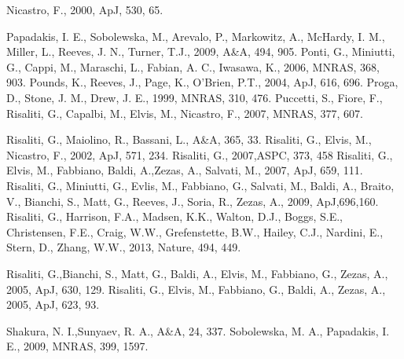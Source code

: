 \documentclass[useAMS,usenatbib]{sam}
\begin{document}
\begin{thebibliography}{99}
    
     Nicastro, F., 2000, ApJ, 530, 65.
    
     Papadakis, I. E., Sobolewska,  M., Arevalo,  P., Markowitz, A., McHardy, I. M., Miller,  L.,
    Reeves, J. N., 
    Turner, T.J., 2009, A\&A, 494, 905.
     Ponti, G., Miniutti, G., Cappi, M., Maraschi, L., Fabian, A. C., Iwasawa, K., 2006, MNRAS, 368, 903.
     Pounds, K., Reeves, J., Page, K., O'Brien, P.T., 2004, ApJ, 616, 696.
     Proga, D., Stone, J. M., Drew, J. E., 1999, MNRAS, 310, 476.
     Puccetti, S., Fiore, F., Risaliti, G., Capalbi, M., Elvis, M., Nicastro, F., 2007, MNRAS, 377, 607.
    

     Risaliti, G., Maiolino, R., Bassani, L., A\&A, 365, 33.
     Risaliti, G., Elvis, M., Nicastro, F., 2002, ApJ, 571, 234.
     Risaliti, G., 2007,ASPC, 373, 458
     Risaliti, G., Elvis, M., Fabbiano, Baldi, A.,Zezas, A., Salvati, M., 2007, ApJ, 659, 111.
     Risaliti, G., Miniutti, G., Evlis, M., Fabbiano, G., Salvati, M., Baldi, A., Braito, V., 
									 Bianchi, S., Matt, G., Reeves, J., Soria, R., Zezas, A., 2009, ApJ,696,160.     
     Risaliti, G., Harrison, F.A., Madsen, K.K., Walton, D.J., Boggs, S.E., Christensen,  F.E., 
							Craig, W.W., Grefenstette, B.W., Hailey, C.J., Nardini, E., Stern, D., Zhang, W.W., 2013, Nature, 494, 449. 

     Risaliti, G.,Bianchi, S., Matt, G., Baldi, A., Elvis, M., Fabbiano, G., Zezas, A., 2005, ApJ,
    630, 129.
     Risaliti, G., Elvis, M., Fabbiano, G., Baldi, A., Zezas, A., 2005, ApJ, 623, 93.
    
     Shakura, N. I.,Sunyaev, R. A., A\&A, 24, 337.
     Sobolewska, M. A., Papadakis, I. E., 2009, MNRAS, 399, 1597.


\end{thebibliography}
\end{document}
